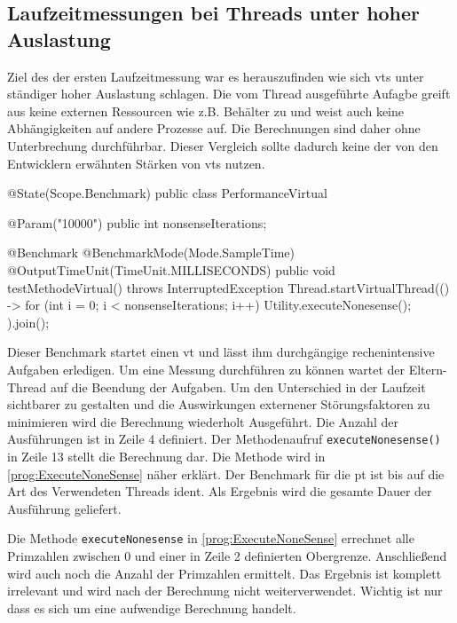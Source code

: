 \subsection{Laufzeitmessungen bei Threads unter hoher Auslastung}                                         
\label{subsec:LaufzeitmessungenbeiThreadsunterhoherAuslastung}

    Ziel des der ersten Laufzeitmessung war es herauszufinden wie sich \Glspl{vt} unter ständiger hoher Auslastung schlagen. Die vom Thread ausgeführte Aufagbe greift aus keine 
    externen Ressourcen wie z.B. Behälter zu und weist auch keine Abhängigkeiten auf andere Prozesse auf. Die Berechnungen sind daher ohne Unterbrechung durchführbar.
    Dieser Vergleich sollte dadurch keine der von den Entwicklern erwähnten  Stärken von \Glspl{vt} nutzen.
    \begin{program} [H]
        \caption{Benchmark eines \Glspl{vt} unter hoher Auslastung}
        \label{prog:BenchmarkEinesVTUnterHoherAuslastung}
    \begin{JavaCode}[language=Java, numbers=left]
@State(Scope.Benchmark)
public class PerformanceVirtual {

    @Param("10000")
    public int nonsenseIterations;

    @Benchmark
    @BenchmarkMode(Mode.SampleTime)
    @OutputTimeUnit(TimeUnit.MILLISECONDS)
    public void testMethodeVirtual() throws InterruptedException {
        Thread.startVirtualThread(() -> {
            for (int i = 0; i < nonsenseIterations; i++)
                Utility.executeNonesense();
        }).join();
    }
}\end{JavaCode}
    \end{program}
    Dieser Benchmark startet einen \gls{vt} und lässt ihm durchgängige rechenintensive Aufgaben erledigen. Um eine Messung durchführen zu können wartet der Eltern-Thread auf
    die Beendung der Aufgaben. Um den Unterschied in der Laufzeit sichtbarer zu gestalten und die Auswirkungen externener Störungsfaktoren zu minimieren 
    wird die Berechnung wiederholt Ausgeführt. Die Anzahl der Ausführungen ist in Zeile 4 definiert. Der Methodenaufruf \texttt{executeNonesense()} in Zeile 13 stellt die Berechnung dar.
    Die Methode wird in \ref{prog:ExecuteNoneSense} näher erklärt. Der Benchmark für die \gls{pt} ist bis auf die Art des Verwendeten Threads ident.
    Als Ergebnis wird die gesamte Dauer der Ausführung geliefert. 

    Die Methode \texttt{executeNonesense} in \ref{prog:ExecuteNoneSense} errechnet alle Primzahlen zwischen 0 und einer in Zeile 2 definierten Obergrenze. Anschließend wird 
    auch noch die Anzahl der Primzahlen ermittelt. Das Ergebnis ist komplett irrelevant und wird nach der Berechnung nicht weiterverwendet. Wichtig ist nur dass es sich um
    eine aufwendige Berechnung handelt.

